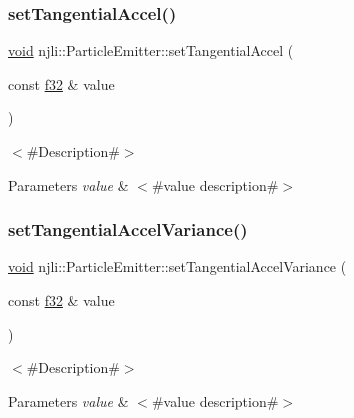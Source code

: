 \subsubsection{\texorpdfstring{set\+Tangential\+Accel()}{setTangentialAccel()}}
{\footnotesize\ttfamily \mbox{\hyperlink{_thread_8h_af1e856da2e658414cb2456cb6f7ebc66}{void}} njli\+::\+Particle\+Emitter\+::set\+Tangential\+Accel (\begin{DoxyParamCaption}\item[{const \mbox{\hyperlink{_util_8h_a5f6906312a689f27d70e9d086649d3fd}{f32}} \&}]{value }\end{DoxyParamCaption})}

$<$\#\+Description\#$>$


\begin{DoxyParams}{Parameters}
{\em value} & $<$\#value description\#$>$ \\
\hline
\end{DoxyParams}
\mbox{\label{classnjli_1_1_particle_emitter_a350b5d3c77cacf23fa7297414d215d0e}} 
\subsubsection{\texorpdfstring{set\+Tangential\+Accel\+Variance()}{setTangentialAccelVariance()}}
{\footnotesize\ttfamily \mbox{\hyperlink{_thread_8h_af1e856da2e658414cb2456cb6f7ebc66}{void}} njli\+::\+Particle\+Emitter\+::set\+Tangential\+Accel\+Variance (\begin{DoxyParamCaption}\item[{const \mbox{\hyperlink{_util_8h_a5f6906312a689f27d70e9d086649d3fd}{f32}} \&}]{value }\end{DoxyParamCaption})}

$<$\#\+Description\#$>$


\begin{DoxyParams}{Parameters}
{\em value} & $<$\#value description\#$>$ \\
\hline
\end{DoxyParams}
\mbox{\label{classnjli_1_1_particle_emitter_a0c4d0379f8b2827b74a5f62cb8755a6b}} 
